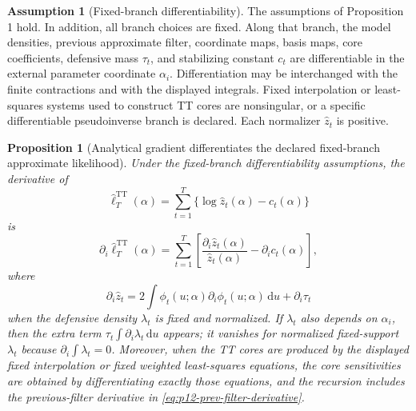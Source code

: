 \documentclass[11pt]{article}
\newcommand{\dd}{\mathrm{d}}
\newcommand{\TT}{\mathrm{TT}}
\newtheorem{proposition}{Proposition}
\theoremstyle{definition}
\newtheorem{assumption}{Assumption}
\theoremstyle{remark}
\begin{document}
\begin{assumption}[Fixed-branch differentiability]
The assumptions of Proposition 1 hold.  In addition, all branch choices are
fixed.  Along that branch, the model densities, previous approximate filter,
coordinate maps, basis maps, core coefficients, defensive mass
\(\tau_t\), and stabilizing constant \(c_t\) are differentiable in the external
parameter coordinate \(\alpha_i\).  Differentiation may be interchanged with
the finite contractions and with the displayed integrals.  Fixed interpolation
or least-squares systems used to construct TT cores are nonsingular, or a
specific differentiable pseudoinverse branch is declared.  Each normalizer
\(\widehat z_t\) is positive.
\end{assumption}

\begin{proposition}[Analytical gradient differentiates the declared fixed-branch approximate likelihood]
Under the fixed-branch differentiability assumptions, the derivative of
\[
  \widehat\ell_T^{\TT}(\alpha)
  =
  \sum_{t=1}^T
  \{\log\widehat z_t(\alpha)-c_t(\alpha)\}
\]
is
\[
  \partial_i\widehat\ell_T^{\TT}(\alpha)
  =
  \sum_{t=1}^T
  \left[
  \frac{\partial_i\widehat z_t(\alpha)}{\widehat z_t(\alpha)}
  -
  \partial_i c_t(\alpha)
  \right],
  \label{eq:p12-score-general}
\]
where
\[
  \partial_i\widehat z_t
  =
  2\int\phi_t(u;\alpha)\partial_i\phi_t(u;\alpha)\,\dd u
  +
  \partial_i\tau_t
  \label{eq:p12-z-derivative-integral}
\]
when the defensive density \(\lambda_t\) is fixed and normalized.  If
\(\lambda_t\) also depends on \(\alpha_i\), then the extra term
\(\tau_t\int\partial_i\lambda_t\,\dd u\) appears; it vanishes for normalized
fixed-support \(\lambda_t\) because \(\partial_i\int\lambda_t=0\).
Moreover, when the TT cores are produced by the displayed fixed interpolation
or fixed weighted least-squares equations, the core sensitivities are obtained
by differentiating exactly those equations, and the recursion includes the
previous-filter derivative in \eqref{eq:p12-prev-filter-derivative}.
\end{proposition}
\end{document}
